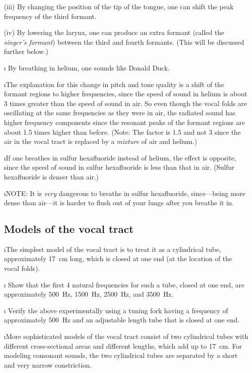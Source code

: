 (iii) By changing the position of the tip of the tongue,
one can shift the peak frequency of the third formant.

(iv) By lowering the larynx, one can produce an extra
formant (called the {\em singer's formant}) between the 
third and fourth formants.  
(This will be discussed further below.)

\i \demo
By breathing in helium, one sounds like Donald Duck.

\i The explanation for this change in pitch and tone
quality is a shift of the formant regions to higher 
frequencies, since the speed of sound in helium
is about 3 times greater than the speed of sound in air.
So even though the vocal folds are oscillating at the
same frequencies as they were in air, the radiated
sound has higher frequency components since
the resonant peaks of the formant regions are about 
1.5 times higher than before. 
(Note: The factor is 1.5 and not 3 since the air 
in the vocal tract is replaced by a {\em mixture} 
of air and helium.)

\i If one breathes in sulfur hexafluoride instead
of helium, the effect is opposite, since the speed of
sound in sulfur hexafluoride is less than that in air.
(Sulfur hexafluoride is denser than air.)

\i NOTE: It is {\em very} dangerous to breathe in
sulfur hexafluoride, since---being more dense
than air---it is harder to flush out of your lungs
after you breathe it in.

\ei
\subsection{Models of the vocal tract}
\bi

\i The simplest model of the vocal tract is to treat
it as a cylindrical tube, approximately 17~cm long,
which is closed at one end (at the location of the vocal
folds).

\i \exer
Show that the first 4 natural frequencies for such
a tube, closed at one end, are approximately 500~Hz,
1500~Hz, 2500~Hz, and 3500~Hz.

\i \demo
Verify the above experimentally using a tuning fork
having a frequency of approximately 500~Hz and an 
adjustable length tube that is closed at one end.

\i More sophisticated models of the vocal tract 
consist of two cylindrical tubes with different
cross-sectional areas and different lengths, 
which add up to 17~cm.
For modeling consonant sounds, the two cylindrical
tubes are separated by a short and very narrow constriction.

